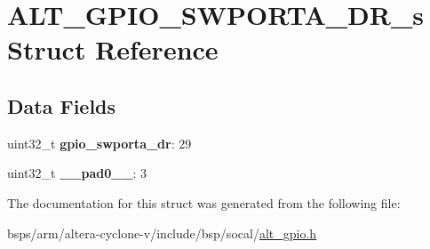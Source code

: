 \hypertarget{structALT__GPIO__SWPORTA__DR__s}{}\section{A\+L\+T\+\_\+\+G\+P\+I\+O\+\_\+\+S\+W\+P\+O\+R\+T\+A\+\_\+\+D\+R\+\_\+s Struct Reference}
\label{structALT__GPIO__SWPORTA__DR__s}
\subsection*{Data Fields}
\begin{DoxyCompactItemize}
\item 
\mbox{\label{structALT__GPIO__SWPORTA__DR__s_a4964e78534e0f8373d2391b79f60078f}} 
uint32\+\_\+t {\bfseries gpio\+\_\+swporta\+\_\+dr}\+: 29
\item 
\mbox{\label{structALT__GPIO__SWPORTA__DR__s_a34c7a41b29a6dc62db463c2a346b21f0}} 
uint32\+\_\+t {\bfseries \+\_\+\+\_\+pad0\+\_\+\+\_\+}\+: 3
\end{DoxyCompactItemize}


The documentation for this struct was generated from the following file\+:\begin{DoxyCompactItemize}
\item 
bsps/arm/altera-\/cyclone-\/v/include/bsp/socal/\mbox{\hyperlink{alt__gpio_8h}{alt\+\_\+gpio.\+h}}\end{DoxyCompactItemize}
